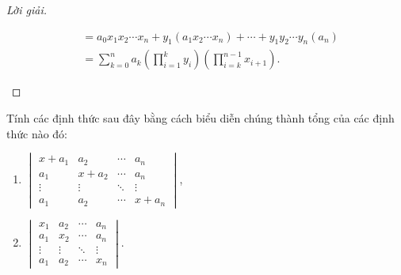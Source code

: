 \documentclass[class=linearalgebra,crop=false]{standalone}
\begin{document}
\begin{proof}[Lời giải]
\begin{enumerate}[label = (\alph*)]
\begin{align*}
                   & = a_{0}x_{1}x_{2}\cdots x_{n}
                  + y_{1} (a_{1}x_{2}\cdots x_{n})
                  + \cdots
                  + y_{1}y_{2}\cdots y_{n} (a_{n})                                                                   \\
                   & = \sum^{n}_{k=0} a_{k}\left(\prod^{k}_{i=1}y_{i}\right)\left(\prod^{n-1}_{i=k}x_{i + 1}\right).
              \end{align*}
    \end{enumerate}
\end{proof}

\begin{exercise}
    Tính các định thức sau đây bằng cách biểu diễn chúng thành tổng của các định thức nào đó:
    \begin{enumerate}[label = (\alph*)]
        \item $\begin{vmatrix}
            x + a_{1} & a_{2}     & \cdots & a_{n}     \\
            a_{1}     & x + a_{2} & \cdots & a_{n}     \\
            \vdots    & \vdots    & \ddots & \vdots    \\
            a_{1}     & a_{2}     & \cdots & x + a_{n}
        \end{vmatrix}$,
        \item $\begin{vmatrix}
            x_{1}  & a_{2}  & \cdots & a_{n}   \\
            a_{1}  & x_{2}  & \cdots & a_{n}   \\
            \vdots & \vdots & \ddots & \vdots  \\
            a_{1}  & a_{2}  & \cdots & x_{n}
        \end{vmatrix}$.
    \end{enumerate}
\end{exercise}
\end{document}
